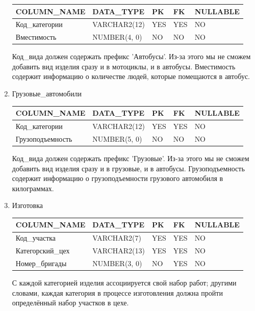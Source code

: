 \begin{enumerate}
\begin{tabular}{|p{7cm}|p{3cm}|p{1cm}|p{1cm}|p{3cm}|}
        {\bf COLUMN\_NAME} & {\bf DATA\_TYPE} & {\bf PK} & {\bf FK} & {\bf NULLABLE} \\ \hline
        Код\_категории & VARCHAR2(12) & YES & YES & NO \\ \hline
        Вместимость & NUMBER(4, 0) & NO & NO & NO \\ \hline

    \end{tabular}

    Код\_вида должен содержать префикс 'Автобусы'.
    Из-за этого мы не сможем добавить вид изделия сразу и в мотоциклы, и в автобусы.
    Вместимость содержит информацию о количестве людей, которые помещаются в автобус.

    \item{Грузовые\_автомобили}

    \begin{tabular}{|p{7cm}|p{3cm}|p{1cm}|p{1cm}|p{3cm}|} \hline

        {\bf COLUMN\_NAME} & {\bf DATA\_TYPE} & {\bf PK} & {\bf FK} & {\bf NULLABLE} \\ \hline
        Код\_категории & VARCHAR2(12) & YES & YES & NO \\ \hline
        Грузоподъемность & NUMBER(5, 0) & NO & NO & NO \\ \hline

    \end{tabular}

    Код\_вида должен содержать префикс 'Грузовые'.
    Из-за этого мы не сможем добавить вид изделия сразу и в грузовые, и в автобусы.
    Грузоподъемность содержит информацию о грузоподъемности грузового автомобиля в килограммах.

    \item{Изготовка}

    \begin{tabular}{|p{7cm}|p{3cm}|p{1cm}|p{1cm}|p{3cm}|} \hline

        {\bf COLUMN\_NAME} & {\bf DATA\_TYPE} & {\bf PK} & {\bf FK} & {\bf NULLABLE} \\ \hline
        Код\_участка & VARCHAR2(7) & YES & YES & NO \\ \hline
        Категорский\_цех & VARCHAR2(13) & YES & YES & NO \\ \hline
        Номер\_бригады & NUMBER(3, 0) & NO & YES & NO \\ \hline

    \end{tabular}

    С каждой категорией изделия ассоциируется свой набор работ;
    другими словами, каждая категория в процессе изготовления должна пройти определённый набор участков в цехе.


\end{enumerate}
